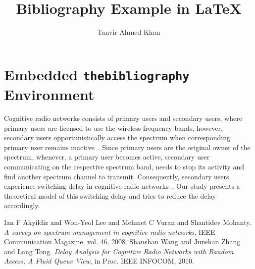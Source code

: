 \documentclass{article}
\title{Bibliography Example in \LaTeX}
\author{Tanvir Ahmed Khan}
\begin{document}
\maketitle
\section{Embedded \texttt{thebibliography} Environment}
Cognitive radio networks consists of primary users and secondary users, where primary users are licensed to use the wireless frequency bands, however, secondary users opportunistically  access the spectrum when corresponding primary user remains inactive~\cite{akyildiz2008survey}. Since primary users are the original owner of the spectrum, whenever, a primary user becomes active, secondary user communicating on the respective spectrum band, needs to stop its activity and find another spectrum channel to transmit. Consequently, secondary users experience switching delay in cognitive radio networks~\cite{wang10infocom}. Our study presents a theoretical model of this switching delay and tries to reduce the delay accordingly.
\begin{thebibliography}{1}
Ian F Akyildiz and Won-Yeol Lee and Mehmet C Vuran and Shantidev Mohanty.
\textit{A survey on spectrum management in cognitive radio networks},
IEEE Communication Magazine, vol. 46, 2008.
Shanshan Wang and Junshan Zhang and Lang Tong.
\textit{Delay Analysis for Cognitive Radio Networks with Random Access: A Fluid Queue View},
in Proc. IEEE INFOCOM, 2010.
\end{thebibliography}
\end{document}
